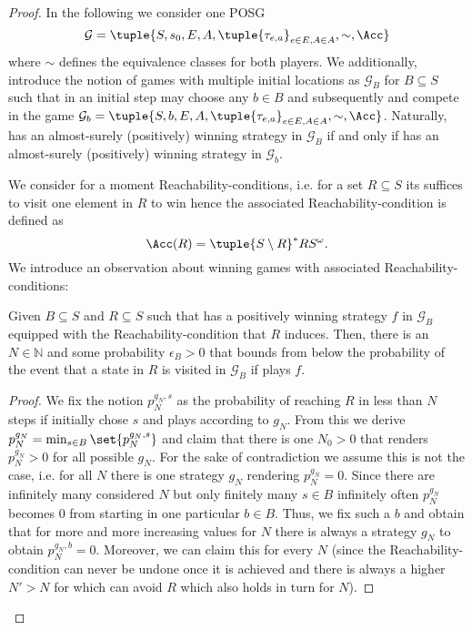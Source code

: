 \begin{proof}
  In the following we consider one \ac{POSG}
  \begin{equation*}
    \mathcal{G} = \tuple{S, s_{0}, E, A, \tuple{\tau_{e,a}}_{e\in E, A\in A}, 
      \sim, \Acc}
  \end{equation*}
  where $\sim$ defines the equivalence classes for both players. We 
  additionally, introduce the notion of games with multiple initial locations 
  as $\mathcal{G}_{B}$ for $B\subseteq S$ such that in an initial step \adam{}
  may choose any $b\in B$ and subsequently \eve{} and \adam{} compete in the
  game $\mathcal{G}_{b} = \tuple{S, b, E, A, 
  \tuple{\tau_{e,a}}_{e\in E, A\in A}, \sim, \Acc}$. Naturally, \eve{} has an 
  almost-surely (positively) winning strategy in $\mathcal{G}_{B}$ if and only 
  if \eve{} has an almost-surely (positively) winning strategy in 
  $\mathcal{G}_{b}$.

  We consider for a moment Reachability-conditions, i.e. for a set
  $R\subseteq S$ its suffices to visit one element in $R$ to win hence the 
  associated Reachability-condition is defined as 
  \begin{equation*}
    \Acc(R) = \tuple{S\setminus R}^{*}RS^{\omega}.
  \end{equation*}
  We introduce an observation about winning games with associated 
  Reachability-conditions:
  \begin{proposition}
    Given $B\subseteq S$ and $R\subseteq S$ such that \eve{} has a positively
    winning strategy $f$ in $\mathcal{G}_{B}$ equipped with the 
    Reachability-condition that $R$ induces. Then, there is an $N\in\mathbb{N}$
    and some probability $\epsilon_{B} > 0$ that bounds from below the 
    probability of the event that a state in $R$ is visited in 
    $\mathcal{G}_{B}$ if \eve{} plays $f$.
  \end{proposition}
  \begin{proof}
    We fix the notion $p_{N}^{g_{N}, s}$ as the probability of reaching $R$ in 
    less than $N$ steps if \adam{} initially chose $s$ and plays according to 
    $g_{N}$. From this we derive $p_{N}^{g_{N}} = 
    \min_{s\in B}\set{p_{N}^{g_{N}, s}}$ and claim that there is one 
    $N_{0} > 0$ that renders $p_{N}^{g_{N}} > 0$ for all possible $g_{N}$. For 
    the sake of contradiction we assume this is not the case, i.e. for all $N$ 
    there is one strategy $g_{N}$ rendering $p_{N}^{g_{N}} = 0$. Since there 
    are infinitely many considered $N$ but only finitely many $s\in B$ 
    infinitely often $p_{N}^{g_{N}}$ becomes $0$ from starting in one 
    particular $b\in B$. Thus, we fix such a $b$ and obtain that for more and 
    more increasing values for $N$ there is always a strategy $g_{N}$ to obtain 
    $p_{N}^{g_{N}, b} = 0$. Moreover, we can claim this for every $N$ (since 
    the Reachability-condition can never be undone once it is achieved and 
    there is always a higher $N' > N$ for which \adam{} can avoid $R$ which 
    also holds in turn for $N$).


\end{proof}
\end{proof}
